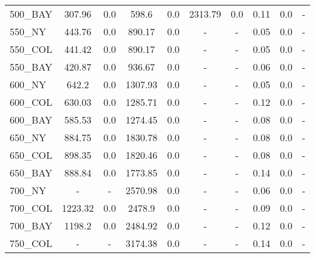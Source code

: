 \documentclass[main.tex]{subfiles}
\begin{document}
\begin{center}
\begin{tabular}{lccccccccc}
500\_BAY & 307.96 & 0.0 & 598.6 & 0.0 & 2313.79 & 0.0 & 0.11 & 0.0 & - \\
550\_NY & 443.76 & 0.0 & 890.17 & 0.0 & - & - 
 & 0.05 & 0.0 & - \\
550\_COL & 441.42 & 0.0 & 890.17 & 0.0 & - & - 
 & 0.05 & 0.0 & - \\
550\_BAY & 420.87 & 0.0 & 936.67 & 0.0 & - & - 
 & 0.06 & 0.0 & - \\
600\_NY & 642.2 & 0.0 & 1307.93 & 0.0 & - & - 
 & 0.05 & 0.0 & - \\
600\_COL & 630.03 & 0.0 & 1285.71 & 0.0 & - & - 
 & 0.12 & 0.0 & - \\
600\_BAY & 585.53 & 0.0 & 1274.45 & 0.0 & - & - 
 & 0.08 & 0.0 & - \\
650\_NY & 884.75 & 0.0 & 1830.78 & 0.0 & - & - 
 & 0.08 & 0.0 & - \\
650\_COL & 898.35 & 0.0 & 1820.46 & 0.0 & - & - 
 & 0.08 & 0.0 & - \\
650\_BAY & 888.84 & 0.0 & 1773.85 & 0.0 & - & - 
 & 0.14 & 0.0 & - \\
700\_NY & - & - 
 & 2570.98 & 0.0 & - & - 
 & 0.06 & 0.0 & - \\
700\_COL & 1223.32 & 0.0 & 2478.9 & 0.0 & - & - 
 & 0.09 & 0.0 & - \\
700\_BAY & 1198.2 & 0.0 & 2484.92 & 0.0 & - & - 
 & 0.12 & 0.0 & - \\
750\_COL & - & - 
 & 3174.38 & 0.0 & - & - 
 & 0.14 & 0.0 & - \\
\hline\end{tabular}
\end{center}
\newpage
\end{document}
